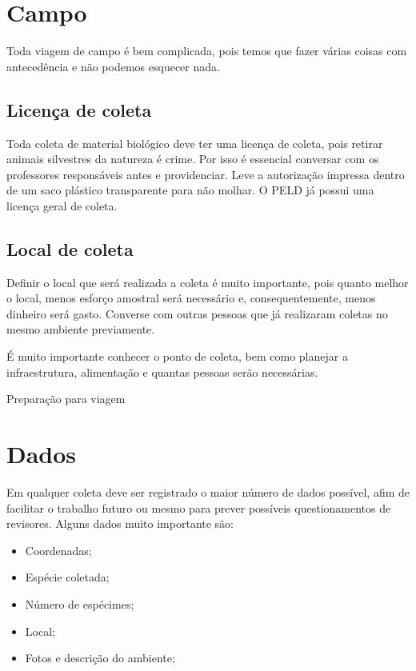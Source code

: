 \documentclass[
  letterpaper,
  DIV=11,
  numbers=noendperiod]{scrreprt}
\begin{document}
\hypertarget{campo}{%
\section{Campo}\label{campo}}

Toda viagem de campo é bem complicada, pois temos que fazer várias
coisas com antecedência e não podemos esquecer nada.

\hypertarget{licenuxe7a-de-coleta}{%
\subsection{Licença de coleta}\label{licenuxe7a-de-coleta}}

Toda coleta de material biológico deve ter uma licença de coleta, pois
retirar animais silvestres da natureza é crime. Por isso é essencial
conversar com os professores responsáveis antes e providenciar. Leve a
autorização impressa dentro de um saco plástico transparente para não
molhar. O PELD já possui uma licença geral de coleta.

\hypertarget{local-de-coleta}{%
\subsection{Local de coleta}\label{local-de-coleta}}

Definir o local que será realizada a coleta é muito importante, pois
quanto melhor o local, menos esforço amostral será necessário e,
consequentemente, menos dinheiro será gasto. Converse com outras pessoas
que já realizaram coletas no mesmo ambiente previamente.

É muito importante conhecer o ponto de coleta, bem como planejar a
infraestrutura, alimentação e quantas pessoas serão necessárias.

Preparação para viagem

\hypertarget{dados}{%
\section{Dados}\label{dados}}

Em qualquer coleta deve ser registrado o maior número de dados possível,
afim de facilitar o trabalho futuro ou mesmo para prever possíveis
questionamentos de revisores. Alguns dados muito importante são:

\begin{itemize}
\item
  Coordenadas;
\item
  Espécie coletada;
\item
  Número de espécimes;
\item
  Local;
\item
  Fotos e descrição do ambiente;
\end{itemize}
\end{document}
